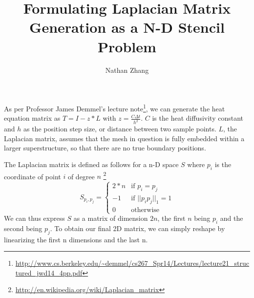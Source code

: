 \documentclass[11pt, oneside]{article}   	%
\title{Formulating Laplacian Matrix Generation as a N-D Stencil Problem}
\author{Nathan Zhang}
\begin{document}
\maketitle
As per Professor James Demmel's lecture note\footnote{\url{http://www.cs.berkeley.edu/~demmel/cs267_Spr14/Lectures/lecture21_structured_jwd14_4pp.pdf}}, we can generate the heat equation matrix as $T = I - z*L$ with $z = \frac{C \Delta t}{h^2}$. $C$ is the heat diffusivity constant and $h$ as the position step size, or distance between two sample points.  $L$, the Laplacian matrix, assumes that the mesh in question is fully embedded within a larger superstructure, so that there are no true boundary positions. 

The Laplacian matrix is defined as follows for a n-D space $S$ where $p_i$ is the coordinate of point $i$ of degree $n$ \footnote{\url{http://en.wikipedia.org/wiki/Laplacian_matrix}}\\
\[
S_{p_i, p_j} =
  \begin{cases}
  	2*n & \text{if } p_i = p_j\\
	-1 & \text{if } ||p_ip_j||_1 = 1\\
	0 & \text{otherwise}
  \end{cases}
\]
We can thus express $S$ as a matrix of dimension $2n$, the first $n$ being $p_i$ and the second being $p_j$. To obtain our final 2D matrix, we can simply reshape by linearizing the first n dimensions and the last n.
\end{document}
